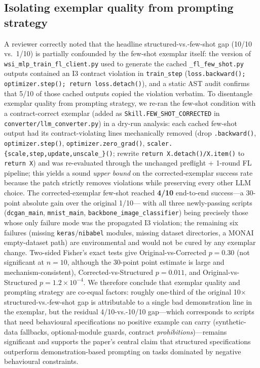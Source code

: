 
\subsection{Isolating exemplar quality from prompting strategy}
\label{sec:exemplar-correction}

A reviewer correctly noted that the headline structured-vs.-few-shot gap
(10/10 vs.\ 1/10) is partially confounded by the few-shot exemplar itself:
the version of \texttt{wsi\_mlp\_train\_fl\_client.py} used to generate the
cached \texttt{\_fl\_few\_shot.py} outputs contained an I3 contract
violation in \texttt{train\_step} (\texttt{loss.backward();
optimizer.step(); return loss.detach()}), and a static AST audit confirms
that 5/10 of those cached outputs copied the violation verbatim. To
disentangle exemplar quality from prompting strategy, we re-ran the
few-shot condition with a contract-correct exemplar (added as
\texttt{Skill.FEW\_SHOT\_CORRECTED} in \texttt{converter/llm\_converter.py})
in a dry-run analysis: each cached few-shot output had its
contract-violating lines mechanically removed (drop \texttt{.backward()},
\texttt{optimizer.step()}, \texttt{optimizer.zero\_grad()},
\texttt{scaler.\{scale,step,update,unscale\_\}()}; rewrite
\texttt{return X.detach()/X.item()} to \texttt{return X}) and was
re-evaluated through the unchanged preflight + 1-round FL pipeline; this
yields a sound \emph{upper bound} on the corrected-exemplar success rate
because the patch strictly removes violations while preserving every other
LLM choice. The corrected-exemplar few-shot reached \textbf{4/10}
end-to-end success---a 30-point absolute gain over the original 1/10---
with all three newly-passing scripts (\texttt{dcgan\_main},
\texttt{mnist\_main}, \texttt{backbone\_image\_classifier}) being precisely
those whose only failure mode was the propagated I3 violation; the
remaining six failures (missing \texttt{keras}/\texttt{nibabel} modules,
missing dataset directories, a MONAI empty-dataset path) are environmental
and would not be cured by any exemplar change. Two-sided Fisher's exact
tests give Original-vs-Corrected $p = 0.30$ (not significant at
$n=10$, although the 30-point point estimate is large and
mechanism-consistent), Corrected-vs-Structured $p = 0.011$, and
Original-vs-Structured $p = 1.2 \times 10^{-4}$. We therefore conclude
that exemplar quality and prompting strategy are co-equal factors:
roughly one-third of the original 10$\times$ structured-vs.-few-shot gap
is attributable to a single bad demonstration line in the exemplar, but
the residual 4/10-vs.-10/10 gap---which corresponds to scripts that need
behavioural specifications no positive example can carry (synthetic-data
fallbacks, optional-module guards, contract \emph{prohibitions})---remains
significant and supports the paper's central claim that structured
specifications outperform demonstration-based prompting on tasks dominated
by negative behavioural constraints.
